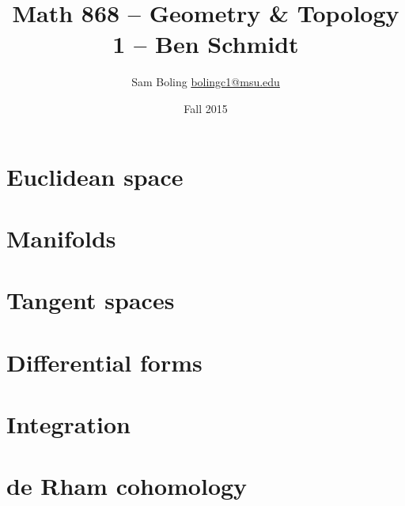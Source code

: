 \documentclass{report}
\title{Math 868 -- Geometry \& Topology 1 -- Ben Schmidt}
\author{Sam Boling \href{mailto:bolingc1@msu.edu}{bolingc1@msu.edu}}
\date{Fall 2015}
\begin{document}
\maketitle

\chapter{Euclidean space}



\chapter{Manifolds}







\chapter{Tangent spaces}



\chapter{Differential forms}


\chapter{Integration}




\chapter{de Rham cohomology}

\end{document}
